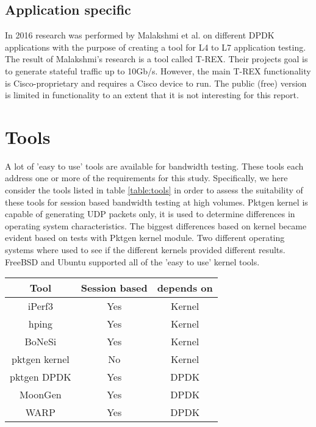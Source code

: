 \subsection{Application specific}
In 2016 research was performed by Malakshmi et al. \cite{mahalakshmi2016study} on different DPDK applications with the purpose of creating a tool for L4 to L7 application testing. 
The result of Malakshmi's research is a tool called T-REX. Their projects goal is to generate stateful traffic up to 10Gb/s. 
However, the main T-REX functionality is Cisco-proprietary and requires a Cisco device to run. The public (free) version is limited in functionality to an extent that it is not interesting for this report.
\section{Tools}\label{sec:tools}
A lot of 'easy to use' tools are available for bandwidth testing. These tools each address one or more of the requirements for this study.
Specifically, we here consider the tools listed in table \ref{table:tools} in order to assess the suitability of these tools for session based bandwidth testing at high volumes.
Pktgen kernel is capable of generating UDP packets only, it is used to determine differences in operating system characteristics. The biggest differences based on kernel became evident based on tests with Pktgen kernel module.
Two different operating systems where used to see if the different kernels provided different results. FreeBSD and Ubuntu supported all of the 'easy to use' kernel tools.

\begin{table*}[ht]
\centering
\begin{tabular}{|c|c|c|} \hline
\textbf{Tool} & \textbf{Session based} & \textbf{depends on} \\ \hline
iPerf3\cite{iperf} & Yes & Kernel  \\ \hline
hping\cite{hping}  & Yes & Kernel \\ \hline
BoNeSi\cite{bonesi} & Yes & Kernel \\ \hline
pktgen kernel\cite{pktgen-kernel} & No & Kernel \\ \hline
pktgen DPDK\cite{pktgen-dpdk} & Yes & DPDK \\ \hline
MoonGen\cite{moongen} & Yes & DPDK \\ \hline
WARP\cite{warp} & Yes & DPDK \\ \hline
\end{tabular}
\caption{Tested tools}
\label{table:tools}
\end{table*} 

